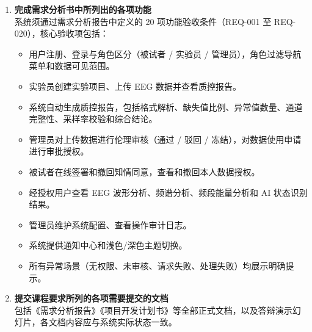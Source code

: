 \begin{enumerate}[(1)]
  \item \textbf{完成需求分析书中所列出的各项功能}\\
  系统须通过需求分析报告中定义的 20 项功能验收条件（REQ-001 至 REQ-020），核心验收项包括：
    \begin{itemize}
      \item 用户注册、登录与角色区分（被试者 / 实验员 / 管理员），角色过滤导航菜单和数据可见范围。
      \item 实验员创建实验项目、上传 EEG 数据并查看质控报告。
      \item 系统自动生成质控报告，包括格式解析、缺失值比例、异常值数量、通道完整性、采样率校验和综合结论。
      \item 管理员对上传数据进行伦理审核（通过 / 驳回 / 冻结），对数据使用申请进行审批授权。
      \item 被试者在线签署和撤回知情同意，查看和撤回本人数据授权。
      \item 经授权用户查看 EEG 波形分析、频谱分析、频段能量分析和 AI 状态识别结果。
      \item 管理员维护系统配置、查看操作审计日志。
      \item 系统提供通知中心和浅色/深色主题切换。
      \item 所有异常场景（无权限、未审核、请求失败、处理失败）均展示明确提示。
    \end{itemize}

  \item \textbf{提交课程要求所列的各项需要提交的文档}\\
  包括《需求分析报告》《项目开发计划书》等全部正式文档，以及答辩演示幻灯片，各文档内容应与系统实际状态一致。

\end{enumerate}
